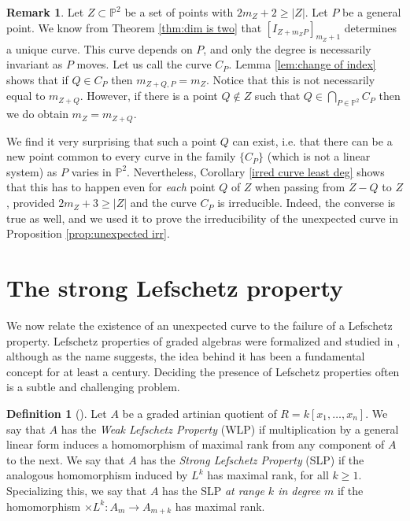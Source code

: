 \documentclass[12pt]{amsart}
\numberwithin{equation}{section}
\theoremstyle{definition}
\newtheorem{definition}[theorem]{Definition}
\newtheorem{remark}[theorem]{Remark}
\begin{document}
\begin{remark}
Let $Z \subset { \ensuremath{\mathbb{P}}}^2$ be a set of points with $2m_Z +2 \ge |Z|$. Let $P$ be a general point. We know from 
Theorem \ref{thm:dim is two}  that   $[I_{Z+m_Z P}]_{m_Z + 1}$ determines a unique curve.    This curve depends on $P$, and only the degree is necessarily invariant as  $P$ moves. Let us call the curve $C_P$.
Lemma \ref{lem:change of index}  shows that if $Q \in C_P$ then $m_{Z+Q,P} = m_Z$. Notice that this is not necessarily equal to $m_{Z+Q}$. However, if there is a point $Q \notin Z$ such that $Q \in \bigcap_{P \in \mathbb P^2} C_P$ then we do obtain $m_Z = m_{Z+Q}$. 

We find it very surprising that such a point $Q$ can exist, i.e. that there can be a new point common to every curve in the family $\{ C_P \}$ (which is not a linear system) as $P$ varies in $\mathbb P^2$. Nevertheless, Corollary \ref{irred curve least deg} shows that this has to happen even for \emph{each} point $Q$ of $Z$ when passing from $Z - Q$ to $Z$, provided $2m_Z +3 \ge |Z|$ and the curve $C_P$ is irreducible. Indeed, the converse is true as well, and we used it to prove the irreducibility of the unexpected curve in Proposition \ref{prop:unexpected irr}. 
\end{remark}

\section{The strong Lefschetz property} 
\label{sec:SLP} 

We now relate the existence of an unexpected curve to the failure of a Lefschetz property. Lefschetz properties of graded algebras were formalized and studied in \cite{HMNW},  although as the name suggests, the idea behind it has been a fundamental concept for at least a century. Deciding the presence of Lefschetz properties often is a subtle and challenging problem. 
       

\begin{definition}[\cite{HMNW}]
Let $A$ be a graded artinian quotient of $R = k[x_1,\dots,x_n]$. We say that $A$ has the {\em Weak Lefschetz Property} (WLP) if multiplication by a general linear form induces a homomorphism of maximal rank from any component of $A$ to the next. We say that $A$ has the {\em Strong Lefschetz Property} (SLP) if the analogous homomorphism induced by $L^k$ has maximal rank, for all $k \geq 1$. Specializing this, we say that $A$ has the SLP {\em at range $k$ in degree $m$} if the homomorphism $\times L^k : A_m \rightarrow A_{m+k}$ has maximal rank.
\end{definition}
\end{document}

